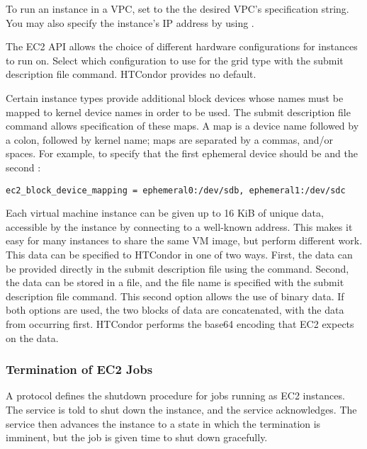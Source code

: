 To run an instance in a VPC, set  to the
the desired VPC's specification string.  You may also specify the instance's
IP address by using .

The EC2 API allows the choice of different hardware configurations 
for instances to run on.
Select which configuration to use for the  grid type
with the  submit description file command.
HTCondor provides no default.

Certain instance types provide additional block devices whose names must be
mapped to kernel device names in order to be used.
The  submit description file command
allows specification of these maps.  
A map is a device name followed by a
colon, followed by kernel name; 
maps are separated by a commas, and/or spaces.
For example, 
to specify that the first ephemeral device should be 
and the second :

\begin{verbatim}
ec2_block_device_mapping = ephemeral0:/dev/sdb, ephemeral1:/dev/sdc
\end{verbatim}

Each virtual machine instance can be given up to 16 KiB of unique data, 
accessible by the instance by connecting to a well-known address.
This makes it easy for many instances to share the same VM image,
but perform different work.
This data can be specified to HTCondor in one of two ways.
First, the data can be provided directly in the submit description file 
using the  command.
Second, the data can be
stored in a file, and the file name is specified with the
 submit description file command.
This second option allows the use of binary data.
If both options are used, the two blocks of
data are concatenated, with the data from  
occurring first.  HTCondor performs the base64 encoding that EC2 expects on 
the data.

\subsubsection{\label{sec:EC2-termination}Termination of EC2 Jobs}

A protocol defines the shutdown procedure for jobs running as
EC2 instances.
The service is told to shut down the instance,
and the service acknowledges.
The service then advances the instance to a state in which
the termination is imminent, but the job is given time to
shut down gracefully.

